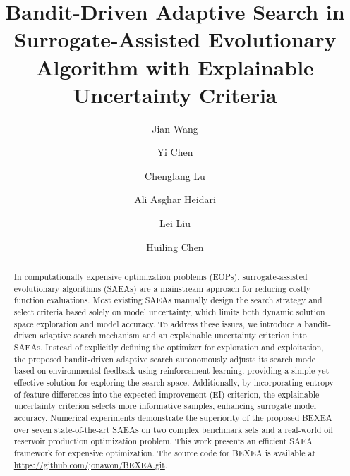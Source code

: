 \documentclass[review]{elsarticle}
\begin{document}
\begin{frontmatter}

\title{\textbf{Bandit-Driven Adaptive Search in Surrogate-Assisted Evolutionary Algorithm with Explainable Uncertainty Criteria}}

\author[aff1]{Jian Wang}

\author[aff1]{Yi Chen}

\author[aff2]{Chenglang Lu}

\author[aff3]{Ali Asghar Heidari}

\author[aff4]{Lei Liu}

\author[aff1]{Huiling Chen}


\address[aff1]{Key Laboratory of Intelligent Informatics for Safety \& Emergency of Zhejiang Province, Wenzhou University, Wenzhou 325035, China}
\address[aff2]{College of modern information technology, Zhejiang Institute of Mechanical and Electrical Engineering, Hangzhou, Zhejiang 310051, China}
\address[aff3]{School of Surveying and Geospatial Engineering, College of Engineering, University of Tehran, Tehran, Iran}
\address[aff4]{College of Computer Science, Sichuan University, Chengdu, Sichuan 610065, China}

\begin{abstract}
In computationally expensive optimization problems (EOPs), surrogate-assisted evolutionary algorithms (SAEAs) are a mainstream approach for reducing costly function evaluations. Most existing SAEAs manually design the search strategy and select criteria based solely on model uncertainty, which limits both dynamic solution space exploration and model accuracy. To address these issues, we introduce a bandit-driven adaptive search mechanism and an explainable uncertainty criterion into SAEAs. Instead of explicitly defining the optimizer for exploration and exploitation, the proposed bandit-driven adaptive search autonomously adjusts its search mode based on environmental feedback using reinforcement learning, providing a simple yet effective solution for exploring the search space. Additionally, by incorporating entropy of feature differences into the expected improvement (EI) criterion, the explainable uncertainty criterion selects more informative samples, enhancing surrogate model accuracy. Numerical experiments demonstrate the superiority of the proposed BEXEA over seven state-of-the-art SAEAs on two complex benchmark sets and a real-world oil reservoir production optimization problem. This work presents an efficient SAEA framework for expensive optimization. The source code for BEXEA is available at \url{https://github.com/jonawon/BEXEA.git}.
\end{abstract}


\end{frontmatter}
\end{document}

